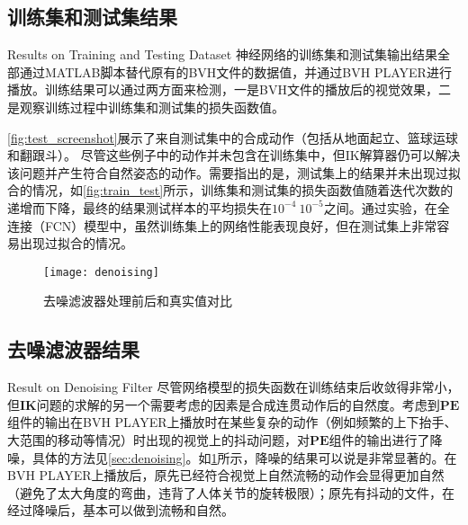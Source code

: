 \subsection{训练集和测试集结果}{Results on Training and Testing Dataset}
神经网络的训练集和测试集输出结果全部通过MATLAB脚本替代原有的BVH文件的数据值，并通过BVH PLAYER进行播放。训练结果可以通过两方面来检测，一是BVH文件的播放后的视觉效果，二是观察训练过程中训练集和测试集的损失函数值。



\cref{fig:test_screenshot}展示了来自测试集中的合成动作（包括从地面起立、篮球运球和翻跟斗）。
尽管这些例子中的动作并未包含在训练集中，但IK解算器仍可以解决该问题并产生符合自然姿态的动作。需要指出的是，测试集上的结果并未出现过拟合的情况，如\cref{fig:train_test}所示，训练集和测试集的损失函数值随着迭代次数的递增而下降，最终的结果测试样本的平均损失在$10^{-4}~10^{-5}$之间。通过实验，在全连接（FCN）模型中，虽然训练集上的网络性能表现良好，但在测试集上非常容易出现过拟合的情况。

\begin{figure}[!htbp]
	\centering
	\texttt{[image: denoising]}
	\caption[]{\label{fig:denoising}
		去噪滤波器处理前后和真实值对比
	}
\end{figure}
\subsection{去噪滤波器结果}{Result on Denoising Filter}
尽管网络模型的损失函数在训练结束后收敛得非常小，但\textbf{IK}问题的求解的另一个需要考虑的因素是合成连贯动作后的自然度。考虑到$\mathbf{PE}$组件的输出在BVH PLAYER上播放时在某些复杂的动作（例如频繁的上下抬手、大范围的移动等情况）时出现的视觉上的抖动问题，对$\mathbf{PE}$组件的输出进行了降噪，具体的方法见\ref{sec:denoising}。如\cref{fig:denoising}所示，降噪的结果可以说是非常显著的。在BVH PLAYER上播放后，原先已经符合视觉上自然流畅的动作会显得更加自然（避免了太大角度的弯曲，违背了人体关节的旋转极限）；原先有抖动的文件，在经过降噪后，基本可以做到流畅和自然。
\label{res:denoising}

